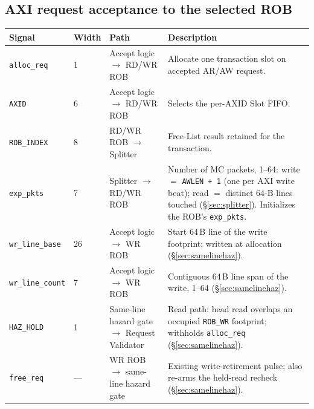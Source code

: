 \subsection{AXI request acceptance to the selected ROB}
\begin{longtable}{p{3.3cm}p{1cm}p{3.4cm}p{7cm}}
\toprule
\textbf{Signal} & \textbf{Width} & \textbf{Path} & \textbf{Description}\\
\midrule
\texttt{alloc\_req} & 1 & Accept logic $\rightarrow$ RD/WR ROB & Allocate one transaction slot on accepted AR/AW request.\\
\texttt{AXID} & 6 & Accept logic $\rightarrow$ RD/WR ROB & Selects the per-AXID Slot FIFO.\\
\texttt{ROB\_INDEX} & 8 & RD/WR ROB $\rightarrow$ Splitter & Free-List result retained for the transaction.\\
\texttt{exp\_pkts} & 7 & Splitter $\rightarrow$ RD/WR ROB & Number of MC packets, 1--64: write $=$ \texttt{AWLEN + 1} (one per AXI write beat); read $=$ distinct 64-B lines touched (\S\ref{sec:splitter}). Initializes the ROB's \texttt{exp\_pkts}.\\
\texttt{wr\_line\_base} & 26 & Accept logic $\rightarrow$ WR ROB & Start 64\,B line of the write footprint; written at allocation (\S\ref{sec:samelinehaz}).\\
\texttt{wr\_line\_count} & 7 & Accept logic $\rightarrow$ WR ROB & Contiguous 64\,B line span of the write, 1--64 (\S\ref{sec:samelinehaz}).\\
\texttt{HAZ\_HOLD} & 1 & Same-line hazard gate $\rightarrow$ Request Validator & Read path: head read overlaps an occupied \texttt{ROB\_WR} footprint; withholds \texttt{alloc\_req} (\S\ref{sec:samelinehaz}).\\
\texttt{free\_req} & --- & WR ROB $\rightarrow$ same-line hazard gate & Existing write-retirement pulse; also re-arms the held-read recheck (\S\ref{sec:samelinehaz}).\\
\bottomrule
\end{longtable}

